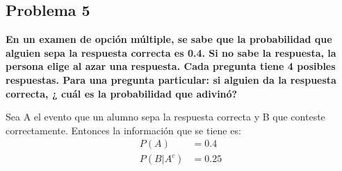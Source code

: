 \subsection*{Problema 5}
\textbf{En un examen de opción múltiple, se sabe que la probabilidad que alguien sepa la respuesta correcta es 0.4. Si no sabe la respuesta, la persona elige al azar una respuesta. Cada pregunta tiene 4 posibles respuestas. Para una pregunta particular: si alguien da la respuesta correcta, ¿ cuál es la probabilidad que adivinó?}

Sea A el evento que un alumno sepa la respuesta correcta y B que conteste correctamente. Entonces la información que se tiene es:
\begin{align*}
    P(A)     & = 0.4  \\
    P(B|A^c) & = 0.25
\end{align*}
